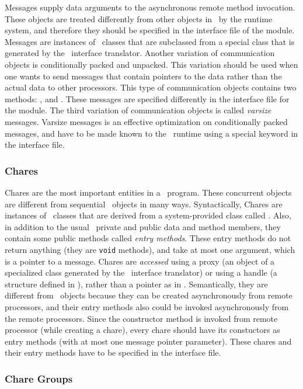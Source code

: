 Messages supply data arguments to the asynchronous remote method invocation.
These objects are treated differently from other objects in \charmpp\ by the
runtime system, and therefore they should be specified in the interface file of
the module.  Messages are instances of \CC\ classes that are subclassed from a
special class that is generated by the \charmpp\ interface translator.  Another
variation of communication objects is conditionally packed and unpacked. This
variation should be used when one wants to send messages that contain pointers
to the data rather than the actual data to other processors. This type of
communication objects contains two methods: , and .
These messages are specified differently in the interface file for the module.
The third variation of communication objects is called {\em varsize} messages.
Varsize messages is an effective optimization on conditionally packed messages,
and have to be made known to the \charmpp\ runtime using a special keyword in
the interface file.

\subsubsection{Chares}

Chares are the most important entities in a \charmpp\ program. These concurrent
objects are different from sequential \CC\ objects in many ways. Syntactically,
Chares are instances of \CC\  classes that are derived from a system-provided
class called . Also, in addition to the usual \CC\ private and
public data and method members, they contain some public methods called {\em
entry methods}. These entry methods do not return anything (they are {\tt void}
methods), and take at most one argument, which is a pointer to a message.
Chares are {\em accessed} using a proxy (an object of a specialized class
generated by the \charmpp\ interface translator) or using a handle (a  structure defined in \charmpp), rather than a pointer as in \CC.
Semantically, they are different from \CC\ objects because they can be created
asynchronously from remote processors, and their entry methods also could be
invoked asynchronously from the remote processors. Since the constructor method
is invoked from remote processor (while creating a chare), every chare should
have its constuctors as entry methods (with at most one message pointer
parameter). These chares and their entry methods have to be specified in the
interface file.

\subsubsection{Chare Groups}

